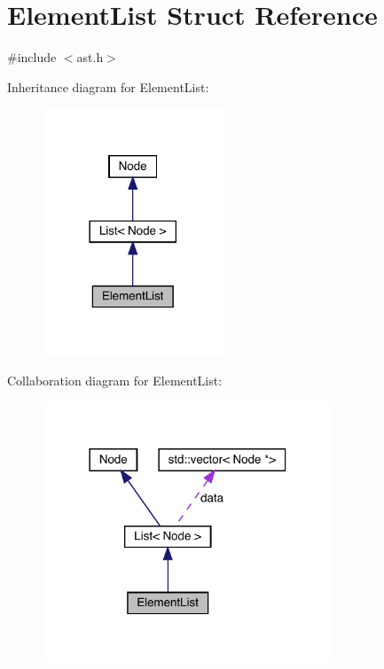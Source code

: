 \hypertarget{struct_element_list}{}\section{Element\+List Struct Reference}
\label{struct_element_list}


{\ttfamily \#include $<$ast.\+h$>$}



Inheritance diagram for Element\+List\+:\nopagebreak
\begin{figure}[H]
\begin{center}
\leavevmode
\includegraphics[width=153pt]{struct_element_list__inherit__graph}
\end{center}
\end{figure}


Collaboration diagram for Element\+List\+:\nopagebreak
\begin{figure}[H]
\begin{center}
\leavevmode
\includegraphics[width=246pt]{struct_element_list__coll__graph}
\end{center}
\end{figure}
